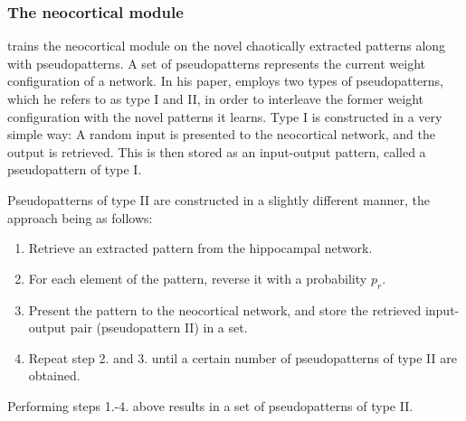 \subsubsection{The neocortical module}

\cite{Hattori2010} trains the neocortical module on the novel chaotically extracted patterns along with pseudopatterns. A set of pseudopatterns represents the current weight configuration of a network. In his paper, \cite{Hattori2010} employs two types of pseudopatterns, which he refers to as type I and II, in order to interleave the former weight configuration with the novel patterns it learns. Type I is constructed in a very simple way: A random input is presented to the neocortical network, and the output is retrieved. This is then stored as an input-output pattern, called a pseudopattern of type I.

Pseudopatterns of type II are constructed in a slightly different manner, the approach being as follows:

\begin{enumerate}
\item Retrieve an extracted pattern from the hippocampal network.
\item For each element of the pattern, reverse it with a probability $p_r$.
\item Present the pattern to the neocortical network, and store the retrieved input-output pair (pseudopattern II) in a set.
\item Repeat step 2. and 3. until a certain number of pseudopatterns of type II are obtained.
\end{enumerate}
Performing steps 1.-4. above results in a set of pseudopatterns of type II.

